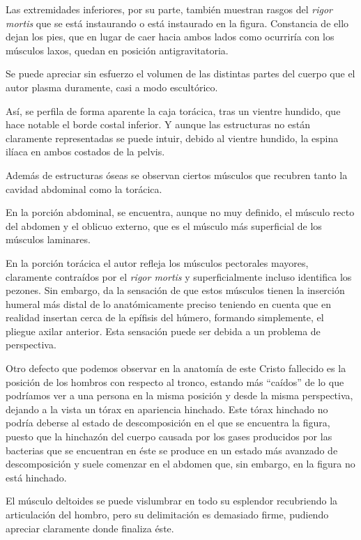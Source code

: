Las extremidades inferiores, por su parte, también muestran rasgos del \textit{rigor mortis} que se está instaurando o está instaurado en la figura. Constancia de ello dejan los pies, que en lugar de caer hacia ambos lados como ocurriría con los músculos laxos, quedan en posición antigravitatoria.

Se puede apreciar sin esfuerzo el volumen de las distintas partes del cuerpo que el autor plasma duramente, casi a modo escultórico.

Así, se perfila de forma aparente la caja torácica, tras un vientre hundido, que hace notable el borde costal inferior. Y aunque las estructuras no están claramente representadas se puede intuir, debido al vientre hundido, la espina ilíaca en ambos costados de la pelvis.

Además de estructuras óseas se observan ciertos músculos que recubren tanto la cavidad abdominal como la torácica.

En la porción abdominal, se encuentra, aunque no muy definido, el músculo recto del abdomen y el oblicuo externo, que es el músculo más superficial de los músculos laminares.

En la porción torácica el autor refleja los músculos pectorales mayores, claramente contraídos por el \textit{rigor mortis} y superficialmente incluso identifica los pezones. Sin embargo, da la sensación de que estos músculos tienen la inserción humeral más distal de lo anatómicamente preciso teniendo en cuenta que en realidad insertan cerca de la epífisis del húmero, formando simplemente, el pliegue axilar anterior. Esta sensación puede ser debida a un problema de perspectiva. 

Otro defecto que podemos observar en la anatomía de este Cristo fallecido es la posición de los hombros con respecto al tronco, estando más ``caídos'' de lo que podríamos ver a una persona en la misma posición y desde la misma perspectiva, dejando a la vista un tórax en apariencia hinchado. Este tórax hinchado no podría deberse al estado de descomposición en el que se encuentra la figura, puesto que la hinchazón del cuerpo causada por los gases producidos por las bacterias que se encuentran en éste se produce en un estado más avanzado de descomposición y suele comenzar  en el abdomen que, sin embargo, en la figura no está hinchado.

El músculo deltoides se puede vislumbrar en todo su esplendor recubriendo la articulación del hombro, pero su delimitación es demasiado firme, pudiendo apreciar claramente donde finaliza éste.

